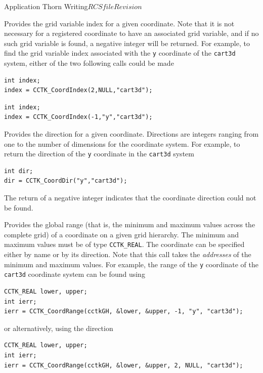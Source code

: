 \begin{cactuspart}{Application Thorn Writing}{$RCSfile$}{$Revision$}
\begin{Lentry}
\item[\texttt{CCTK\_CoordIndex}]

Provides the grid variable index for a given coordinate. Note that it is
not necessary for a registered coordinate to have an associated grid variable,
and if no such grid variable is found, a negative integer will be returned.
For example, to find the grid variable index associated with the \texttt{y}
coordinate of the \texttt{cart3d} system, either of the two following
calls could be made
%
\begin{verbatim}
int index;
index = CCTK_CoordIndex(2,NULL,"cart3d");
\end{verbatim}
%
\begin{verbatim}
int index;
index = CCTK_CoordIndex(-1,"y","cart3d");
\end{verbatim}


\item[\texttt{CCTK\_CoordDir}]

Provides the direction for a given coordinate. Directions are integers
ranging from one to the number of dimensions for the coordinate system.
For example, to return the direction of the \texttt{y} coordinate in
the \texttt{cart3d} system
%
\begin{verbatim}
int dir;
dir = CCTK_CoordDir("y","cart3d");
\end{verbatim}

The return of a negative integer indicates that the coordinate direction
could not be found.

\item[\texttt{CCTK\_CoordRange}]

Provides the global range (that is, the minimum and maximum values across
the complete grid) of a coordinate on a given grid hierarchy. The minimum and maximum values must be of type \texttt{CCTK\_REAL}. The
coordinate can be specified either by name or by its direction. Note that
this call takes the \emph{addresses} of the minimum and maximum values.
For example, the range of the \texttt{y} coordinate of the \texttt{cart3d}
coordinate system can be found using
%
\begin{verbatim}
CCTK_REAL lower, upper;
int ierr;
ierr = CCTK_CoordRange(cctkGH, &lower, &upper, -1, "y", "cart3d");
\end{verbatim}
or alternatively, using the direction
%
\begin{verbatim}
CCTK_REAL lower, upper;
int ierr;
ierr = CCTK_CoordRange(cctkGH, &lower, &upper, 2, NULL, "cart3d");
\end{verbatim}



\end{Lentry}
\end{cactuspart}
